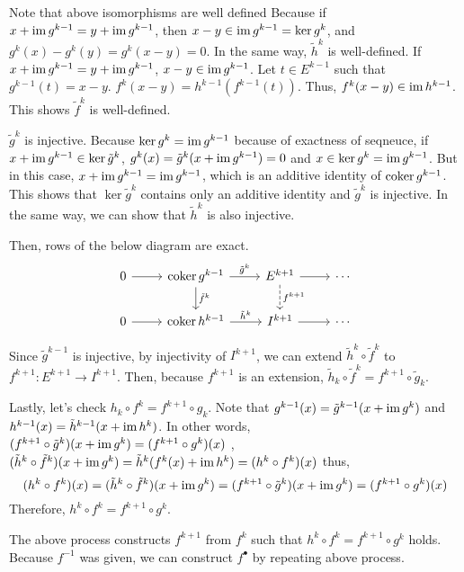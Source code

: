 Note that above isomorphisms are well defined
Because
if \(x + \textnormal{im}\, g^{k - 1} = y + \textnormal{im}\, g^{k - 1}\),
then \(x - y \in \textnormal{im}\, g^{k - 1} = \ker g^{k}\),
and \(g^{k}(x) - g^{k}(y) = g^{k}(x - y) = 0\).
In the same way, \(\tilde h^{k}\) is well-defined.
If \(x + \textnormal{im}\, g^{k - 1} = y + \textnormal{im}\, g^{k - 1}\),
\(x - y \in \textnormal{im}\, g^{k - 1}\).
Let \(t \in E^{k - 1}\) such that \(g^{k - 1}(t) = x - y\).
\(f^k(x - y) = h^{k - 1}(f^{k - 1}(t))\).
Thus, \(f^k(x - y) \in \textnormal{im}\, h^{k - 1}\).
This shows \(\tilde f^k\) is well-defined.

\(\tilde g^{k}\) is injective.
Because \(\ker g^{k} = \textnormal{im}\, g^{k - 1}\) because of exactness of seqneuce,
if \(x + \textnormal{im}\, g^{k - 1} \in \ker \tilde g^{k}\),
\(g^{k}(x) = \tilde g^{k}(x + \textnormal{im}\, g^{k - 1}) = 0\)
and
\(x \in \ker g^{k} = \textnormal{im}\, g^{k - 1}\).
But in this case, \(x + \textnormal{im}\, g^{k - 1} = \textnormal{im}\, g^{k - 1}\),
which is an additive identity of \(\textnormal{coker}\, g^{k - 1}\).
This shows that \(\ker \tilde g^{k}\) contains only an additive identity
and \(\tilde g^{k}\) is injective.
In the same way, we can show that \(\tilde h^{k}\) is also injective.

Then, rows of the below diagram are exact.
\[\begin{tikzcd}
  0 \ar{r} & \coker g^{k - 1} \ar["\tilde f^{k}"]{d} \ar["\tilde g^{k}"]{r} & E^{k + 1} \ar[dashed, "f^{k + 1}"]{d} \ar{r} & \cdots \\
  0 \ar{r} & \coker h^{k - 1} \ar["\tilde h^{k}"]{r} & I^{k + 1} \ar{r} & \cdots
\end{tikzcd}\]

Since \(\tilde g^{k - 1}\) is injective,
by injectivity of \(I^{k + 1}\),
we can extend \(\tilde h^k \circ \tilde f^k\) to \(f^{k + 1}: E^{k + 1} \to I^{k + 1}\).
Then, because \(f^{k + 1}\) is an extension,
\(\tilde h_{k} \circ \tilde f^{k} = f^{k + 1} \circ \tilde g_{k}\).

Lastly, let's check \(h_{k} \circ f^{k} = f^{k + 1} \circ g_{k}\).
Note that
\(g^{k - 1}(x) = \tilde g^{k - 1}(x + \textnormal{im}\, g^{k})\)
and
\(h^{k - 1}(x) = \tilde h^{k - 1}(x + \textnormal{im}\, h^{k})\).
In other words,
\((f^{k + 1} \circ \tilde g^{k})(x + \textnormal{im}\, g^{k}) = (f^{k + 1} \circ g^{k})(x)\)
,
\((\tilde h^{k} \circ \tilde f^{k})(x + \textnormal{im}\, g^{k}) = \tilde h^{k}(f^{k}(x) + \textnormal{im}\, h^{k}) = (h^{k} \circ f^{k})(x)\)
thus,
\[(h^{k} \circ f^{k})(x) = (\tilde h^{k} \circ \tilde f^{k})(x + \textnormal{im}\, g^{k}) =
  (f^{k + 1} \circ \tilde g^{k})(x + \textnormal{im}\, g^{k}) = (f^{k + 1} \circ g^{k})(x) \]
Therefore, \(h^{k} \circ f^{k} = f^{k + 1} \circ g^{k}\).

The above process constructs \(f^{k + 1}\) from \(f^{k}\) such that
\(h^{k} \circ f^{k} = f^{k + 1} \circ g^{k}\) holds.
Because \(f^{-1}\) was given,
we can construct \(f^\bullet\) by repeating above process.
\qedsq

